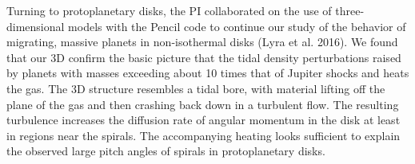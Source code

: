 \documentclass[12pt,preprint]{aastex}
\begin{document}
Turning to protoplanetary disks, the PI collaborated on the use of three-dimensional models with the Pencil code to continue our study of the behavior of migrating, massive planets in non-isothermal disks (Lyra et al. 2016).  We found that our 3D confirm the basic picture that  the tidal density perturbations raised by planets with masses exceeding about 10 times that of Jupiter shocks and  heats the gas. The 3D structure resembles a tidal bore, with material lifting off the plane of the gas and then crashing back down in a turbulent flow.  The resulting turbulence increases the diffusion rate of angular momentum in the disk at least in regions near the spirals. The accompanying heating looks sufficient to explain the observed large pitch angles of spirals in protoplanetary disks.
\end{document}
